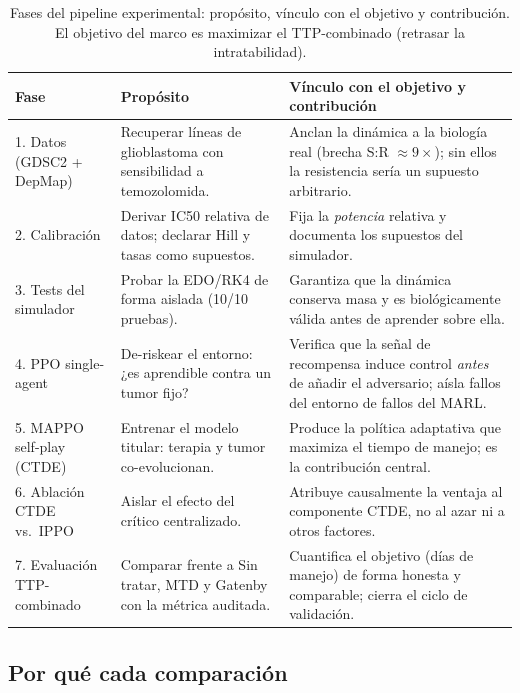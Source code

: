\begin{table}[H]
\centering
\caption{Fases del pipeline experimental: propósito, vínculo con el objetivo y contribución. El objetivo del marco es maximizar el TTP-combinado (retrasar la intratabilidad).}
\label{tab:pipeline}
\renewcommand{\arraystretch}{1.3}
\begin{tabular}{p{2.4cm}|p{4.0cm}|p{5.7cm}}
\textbf{Fase} & \textbf{Propósito} & \textbf{Vínculo con el objetivo y contribución} \\
\hline
1. Datos (GDSC2 + DepMap) & Recuperar líneas de glioblastoma con sensibilidad a temozolomida. & Anclan la dinámica a la biología real (brecha S:R $\approx 9\times$); sin ellos la resistencia sería un supuesto arbitrario. \\
2. Calibración & Derivar IC50 relativa de datos; declarar Hill y tasas como supuestos. & Fija la \emph{potencia} relativa y documenta los supuestos del simulador. \\
3. Tests del simulador & Probar la EDO/RK4 de forma aislada (10/10 pruebas). & Garantiza que la dinámica conserva masa y es biológicamente válida antes de aprender sobre ella. \\
4. PPO single-agent & De-riskear el entorno: ¿es aprendible contra un tumor fijo? & Verifica que la señal de recompensa induce control \emph{antes} de añadir el adversario; aísla fallos del entorno de fallos del MARL. \\
5. MAPPO self-play (CTDE) & Entrenar el modelo titular: terapia y tumor co-evolucionan. & Produce la política adaptativa que maximiza el tiempo de manejo; es la contribución central. \\
6. Ablación CTDE vs.\ IPPO & Aislar el efecto del crítico centralizado. & Atribuye causalmente la ventaja al componente CTDE, no al azar ni a otros factores. \\
7. Evaluación TTP-combinado & Comparar frente a Sin tratar, MTD y Gatenby con la métrica auditada. & Cuantifica el objetivo (días de manejo) de forma honesta y comparable; cierra el ciclo de validación. \\
\end{tabular}
\end{table}

\subsection{Por qué cada comparación}
\label{sec:porque-comparaciones}

